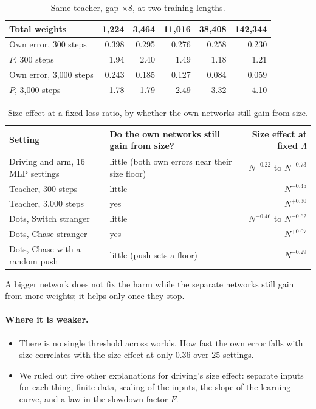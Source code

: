 \documentclass[11pt]{article}
\newcommand{\Lam}{\Lambda}
\newcommand{\para}[1]{\paragraph{#1}}
\begin{document}
\begin{table}[h]
\centering\small
\caption{Same teacher, gap $\times8$, at two training lengths.}
\label{tab:size}
\begin{tabular}{@{}lrrrrr@{}}
\toprule
Total weights & 1,224 & 3,464 & 11,016 & 38,408 & 142,344 \\
\midrule
Own error, 300 steps & 0.398 & 0.295 & 0.276 & 0.258 & 0.230 \\
$P$, 300 steps & 1.94 & 2.40 & 1.49 & 1.18 & 1.21 \\
Own error, 3,000 steps & 0.243 & 0.185 & 0.127 & 0.084 & 0.059 \\
$P$, 3,000 steps & 1.78 & 1.79 & 2.49 & 3.32 & 4.10 \\
\bottomrule
\end{tabular}
\end{table}

\begin{table}[h]
\centering\small
\caption{Size effect at a fixed loss ratio, by whether the own networks still gain from size.}
\label{tab:sizeall}
\begin{tabularx}{\linewidth}{@{}YYr@{}}
\toprule
Setting & Do the own networks still gain from size? & Size effect at fixed $\Lam$ \\
\midrule
Driving and arm, 16 MLP settings & little (both own errors near their size floor) & $N^{-0.22}$ to $N^{-0.73}$ \\
Teacher, 300 steps & little & $N^{-0.45}$ \\
Teacher, 3,000 steps & yes & $N^{+0.30}$ \\
Dots, Switch stranger & little & $N^{-0.46}$ to $N^{-0.62}$ \\
Dots, Chase stranger & yes & $N^{+0.07}$ \\
Dots, Chase with a random push & little (push sets a floor) & $N^{-0.29}$ \\
\bottomrule
\end{tabularx}
\end{table}

\begin{takeaway}
A bigger network does not fix the harm while the separate networks still gain from more weights; it helps only once they stop.
\end{takeaway}

\para{Where it is weaker.}
\begin{itemize}
\item There is no single threshold across worlds. How fast the own error falls with size correlates with the size effect at only 0.36 over 25 settings.
\item We ruled out five other explanations for driving's size effect: separate inputs for each thing, finite data, scaling of the inputs, the slope of the learning curve, and a law in the slowdown factor $F$.
\end{itemize}
\end{document}
